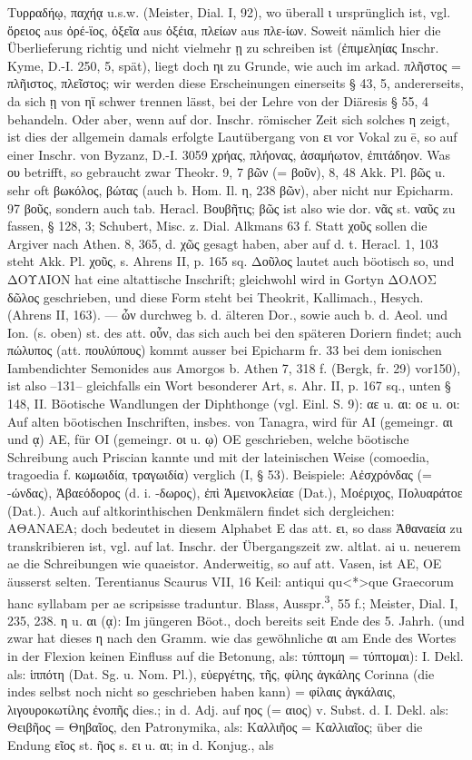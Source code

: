 Τυρραδήῳ, παχήᾳ u.s.w. (Meister, Dial. I, 92), wo überall ι ursprünglich ist, vgl. ὄρειος aus ὀρέ-ϊος, ὀξεῖα aus ὀξέια, πλείων aus πλε-ίων. Soweit nämlich hier die Überlieferung richtig und nicht vielmehr ῃ zu schreiben ist (ἐπιμεληίας Inschr. Kyme, D.-I. 250, 5, spät), liegt doch ηι zu Grunde, wie auch im arkad. πλῆστος = πλῆιστος, πλεῖστος; wir werden diese Erscheinungen einerseits § 43, 5, andererseits, da sich ῃ von ηϊ schwer trennen lässt, bei der Lehre von der Diäresis § 55, 4 behandeln. Oder aber, wenn auf dor. Inschr. römischer Zeit sich solches η zeigt, ist dies der allgemein damals erfolgte Lautübergang von ει vor Vokal zu ē, so auf einer Inschr. von Byzanz, D.-I. 3059 χρήας, πλήονας, ἀσαμήωτον, ἐπιτάδηον. Was ου betrifft, so gebraucht zwar Theokr. 9, 7 βῶν (= βοῦν), 8, 48 Akk. Pl. βῶς u. sehr oft βωκόλος, βώτας (auch b. Hom. Il. η, 238 βῶν), aber nicht nur Epicharm. 97 βοῦς, sondern auch tab. Heracl. Βουβῆτις; βῶς ist also wie dor. νᾶς st. ναῦς zu fassen, § 128, 3; Schubert, Misc. z. Dial. Alkmans 63 f. Statt χοῦς sollen die Argiver nach Athen. 8, 365, d. χῶς gesagt haben, aber auf d. t. Heracl. 1, 103 steht Akk. Pl. χοῦς, s. Ahrens II, p. 165 sq. Δοῦλος lautet auch böotisch so, und ΔΟΥΛΙΟΝ hat eine altattische Inschrift; gleichwohl wird in Gortyn ΔΟΛΟΣ δῶλος geschrieben, und diese Form steht bei Theokrit, Kallimach., Hesych. (Ahrens II, 163). — ὦν durchweg b. d. älteren Dor., sowie auch b. d. Aeol. und Ion. (s. oben) st. des att. οὖν, das sich auch bei den späteren Doriern findet; auch πώλυπος (att. πουλύπους) kommt ausser bei Epicharm fr. 33 bei dem ionischen Iambendichter Semonides aus Amorgos b. Athen 7, 318 f. (Bergk, fr. 29) vor150), ist also --131-- gleichfalls ein Wort besonderer Art, s. Ahr. II, p. 167 sq., unten § 148, II. Böotische Wandlungen der Diphthonge (vgl. Einl. S. 9): αε u. αι: οε u. οι: Auf alten böotischen Inschriften, insbes. von Tanagra, wird für ΑΙ (gemeingr. αι und ᾳ) ΑΕ, für ΟΙ (gemeingr. οι u. ῳ) ΟΕ geschrieben, welche böotische Schreibung auch Priscian kannte und mit der lateinischen Weise (comoedia, tragoedia f. κωμωιδία, τραγωιδία) verglich (I, § 53). Beispiele: Αἐσχρόνδας (= -ώνδας), Ἀβαεόδορος (d. i. -δωρος), ἐπὶ Ἀμεινοκλείαε (Dat.), Μοέριχος, Πολυαράτοε (Dat.). Auch auf altkorinthischen Denkmälern findet sich dergleichen: ΑΘΑΝΑΕΑ; doch bedeutet in diesem Alphabet E das att. ει, so dass Ἀθαναεία zu transkribieren ist, vgl. auf lat. Inschr. der Übergangszeit zw. altlat. ai u. neuerem ae die Schreibungen wie quaeistor. Anderweitig, so auf att. Vasen, ist ΑΕ, ΟΕ äusserst selten. Terentianus Scaurus VII, 16 Keil: antiqui qu<*>que Graecorum hanc syllabam per ae scripsisse traduntur. Blass, Ausspr.\textsuperscript{3}, 55 f.; Meister, Dial. I, 235, 238. η u. αι (ᾳ): Im jüngeren Böot., doch bereits seit Ende des 5. Jahrh. (und zwar hat dieses η nach den Gramm. wie das gewöhnliche αι am Ende des Wortes in der Flexion keinen Einfluss auf die Betonung, als: τύπτομη = τύπτομαι): I. Dekl. als: ἱππότη (Dat. Sg. u. Nom. Pl.), εὐεργέτης, τῆς, φίλης ἀγκάλης Corinna (die indes selbst noch nicht so geschrieben haben kann) = φίλαις ἀγκάλαις, λιγουροκωτίλης ἐνοπῆς dies.; in d. Adj. auf ηος (= αιος) v. Subst. d. I. Dekl. als: Θειβῆος = Θηβαῖος, den Patronymika, als: Καλλιῆος = Καλλιαῖος; über die Endung εῖος st. ῆος s. ει u. αι; in d. Konjug., als 